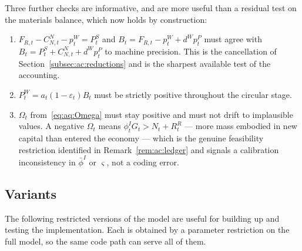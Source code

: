 Three further checks are informative, and are more useful than a residual test on the materials balance, which now holds by construction:
\begin{enumerate}[label=(\arabic*),leftmargin=2.4em]
\item $F_{R,t}-C^N_{N,t}-p^W_t=P^S_t$ and $B_t=F_{R,t}-p^W_t+d^Wp^P_t$ must agree with $B_t=P^S_t+C^N_{N,t}+d^Wp^P_t$ to machine precision. This is the cancellation of Section~\ref{subsec:ac:reductions} and is the sharpest available test of the accounting.
\item $P^W_t=a_t\left(1-\varepsilon_t\right)B_t$ must be strictly positive throughout the circular stage.
\item $\Omega_t$ from~\eqref{eq:aq:Omega} must stay positive and must not drift to implausible values. A negative $\Omega_t$ means $\phi^I_tG_t>N_t+R^R_t$ --- more mass embodied in new capital than entered the economy --- which is the genuine feasibility restriction identified in Remark~\ref{rem:ac:ledger} and signals a calibration inconsistency in $\bar\phi^I$ or $\varsigma$, not a coding error.
\end{enumerate}

\subsection{Variants}
\label{subsec:aq:variants}

The following restricted versions of the model are useful for building up and testing the implementation. Each is obtained by a parameter restriction on the full model, so the same code path can serve all of them.


